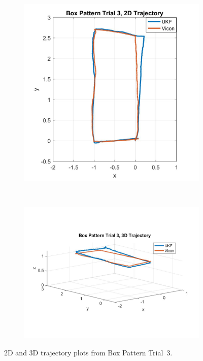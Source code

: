 \begin{figure}
    \centering
    \begin{subfigure}{0.4\textwidth}
        \includegraphics[width=\textwidth,left]{box3_2d}
    \end{subfigure}%
    ~ 
    \begin{subfigure}{0.6\textwidth}
        \centering
        \includegraphics[width=\textwidth,right]{box3_3d}
    \end{subfigure}
    \caption[Box Pattern Trial 3 Trajectory]{2D and 3D trajectory plots from Box Pattern Trial~3.}
    \label{fig:box3_traj}
\end{figure}

